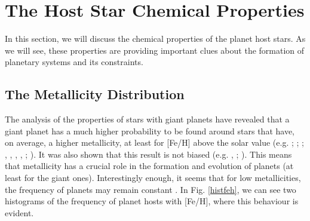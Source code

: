 \documentclass[dvips,12pt,a4paper]{report}
\begin{document}
\section{The Host Star Chemical Properties}

In this section, we will discuss the chemical properties of the planet host stars. As we will see, these properties are providing important clues about the formation of planetary systems and its constraints.

\subsection {The Metallicity Distribution}
\label{metal}
The analysis of the properties of stars with giant planets have revealed that a giant planet has a much higher probability to be found around stars that have, on average, a higher metallicity, at least for [Fe/H] above the solar value (e.g. \citeauthor{Gonzalez-1998} \citeyear{Gonzalez-1998}; \citeauthor{Gonzalez-2001} \citeyear{Gonzalez-2001}; \citeauthor{Laws-2003} \citeyear{Laws-2003}; \citeauthor{Santos-2001a} \citeyear{Santos-2001b}, \citeyear{Santos-2001a}, \citeyear{Santos-2003}, \citeyear{Santos-2004b}, \citeyear{Santos-2005a}; \citeauthor{Fischer-2005} \citeyear{Fischer-2005}). It was also shown that this result is not biased  (e.g. \citeauthor{Santos-2003} \citeyear{Santos-2003}, \citeyear{Santos-2004b}; \citeauthor{Fischer-2005} \citeyear{Fischer-2005}). This means that metallicity has a crucial role in the formation and evolution of planets (at least for the giant ones). Interestingly enough, it seems that for low metallicities, the frequency of planets may remain constant \citep{Santos-2004b}. In Fig. \ref{histfeh}, we can see two histograms of the frequency of planet hosts with [Fe/H], where this behaviour is evident.
\end{document}
